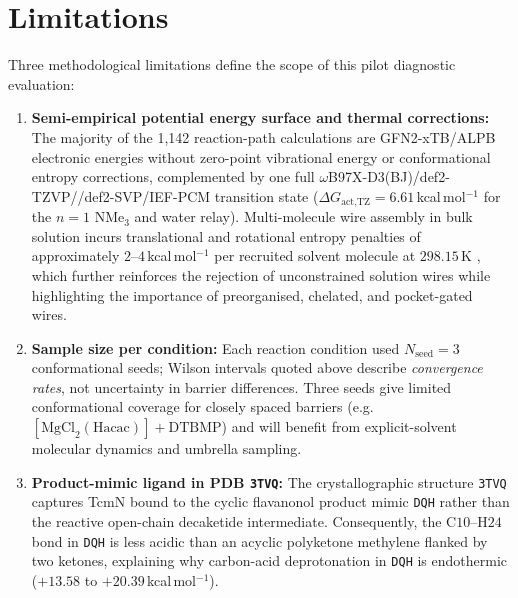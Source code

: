 \documentclass[11pt,a4paper]{article}
\begin{document}
\section{Limitations}
Three methodological limitations define the scope of this pilot diagnostic evaluation:
\begin{enumerate}
\item \textbf{Semi-empirical potential energy surface and thermal corrections:} The majority of the 1{,}142 reaction-path calculations are GFN2-xTB/ALPB electronic energies without zero-point vibrational energy or conformational entropy corrections, complemented by one full $\omega$B97X-D3(BJ)/def2-TZVP//def2-SVP/IEF-PCM transition state ($\Delta G_{\text{act,TZ}} = 6.61$\,kcal\,mol$^{-1}$ for the $n=1$ $\text{NMe}_3$ and water relay). Multi-molecule wire assembly in bulk solution incurs translational and rotational entropy penalties of approximately $2$--$4$\,kcal\,mol$^{-1}$ per recruited solvent molecule at $298.15$\,K \cite{armstrong2014}, which further reinforces the rejection of unconstrained solution wires while highlighting the importance of preorganised, chelated, and pocket-gated wires.
\item \textbf{Sample size per condition:} Each reaction condition used $N_{\text{seed}} = 3$ conformational seeds; Wilson intervals quoted above describe \textit{convergence rates}, not uncertainty in barrier differences. Three seeds give limited conformational coverage for closely spaced barriers (e.g.\ $[\text{MgCl}_2(\text{Hacac})] + \text{DTBMP}$) and will benefit from explicit-solvent molecular dynamics and umbrella sampling.
\item \textbf{Product-mimic ligand in PDB \texttt{3TVQ}:} The crystallographic structure \texttt{3TVQ} captures TcmN bound to the cyclic flavanonol product mimic \texttt{DQH} rather than the reactive open-chain decaketide intermediate. Consequently, the $\text{C10--H24}$ bond in \texttt{DQH} is less acidic than an acyclic polyketone methylene flanked by two ketones, explaining why carbon-acid deprotonation in \texttt{DQH} is endothermic ($+13.58$ to $+20.39$\,kcal\,mol$^{-1}$).
\end{enumerate}
\end{document}
